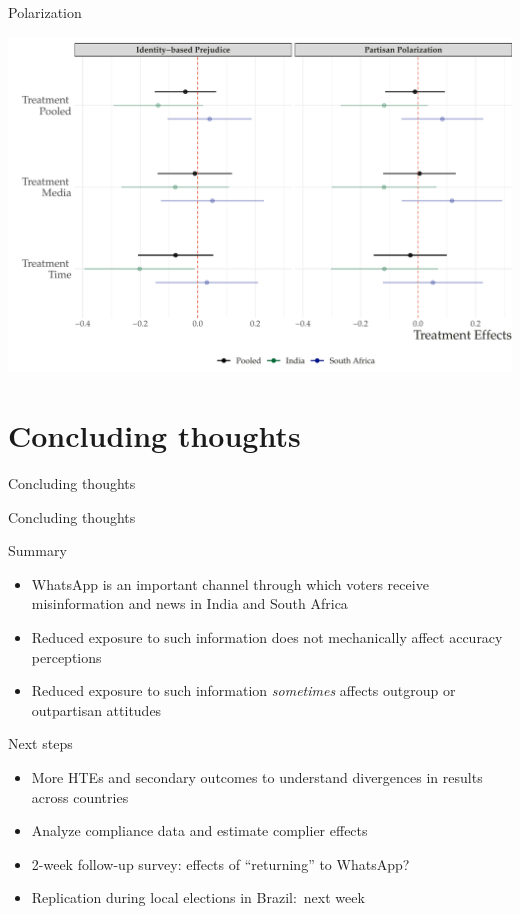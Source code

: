 \documentclass[usenames,dvipsnames,t]{beamer}
\begin{document}
\begin{frame}{Polarization} \small  
\begin{center}
\includegraphics[scale=.37]{h_polarization}
\end{center}
\end{frame}


\section{Concluding thoughts}


\begin{frame}[plain]
\vspace{3cm}
\centering
\LARGE 
Concluding thoughts

\end{frame}


\begin{frame}{Concluding thoughts} \small  

Summary

\begin{itemize}
\item WhatsApp is an important channel through which voters receive
misinformation and news in India and South Africa
\item Reduced exposure to such information does not mechanically affect accuracy perceptions
\item Reduced exposure to such information \textit{sometimes} affects outgroup or outpartisan attitudes 
\end{itemize}

\pause 
\vspace{.25cm} 

Next steps

\begin{itemize}
\item More HTEs and secondary outcomes to understand divergences in results across countries
\item Analyze compliance data  and estimate complier effects
\item 2-week follow-up survey: effects of ``returning'' to WhatsApp?
\item Replication during local elections in Brazil: next week 
\end{itemize}

\end{frame}
\end{document}
